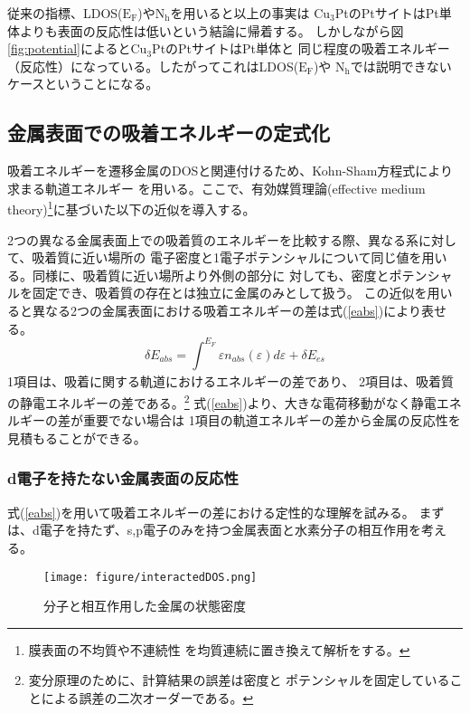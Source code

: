 \documentclass[12pt]{ltjsarticle}
\begin{document}
従来の指標、LDOS($\text{E}_\text{F}$)や$\text{N}_\text{h}$を用いると以上の事実は
$\text{Cu}_\text{3}$PtのPtサイトはPt単体よりも表面の反応性は低いという結論に帰着する。
しかしながら図\ref{fig:potential}によると$\text{Cu}_\text{3}$PtのPtサイトはPt単体と
同じ程度の吸着エネルギー（反応性）になっている。したがってこれはLDOS($\text{E}_\text{F}$)や
$\text{N}_\text{h}$では説明できないケースということになる。

\subsection{金属表面での吸着エネルギーの定式化}
吸着エネルギーを遷移金属のDOSと関連付けるため、Kohn-Sham方程式により求まる軌道エネルギー
を用いる。ここで、有効媒質理論(effective medium theory)\footnote{膜表面の不均質や不連続性
を均質連続に置き換えて解析をする。}に基づいた以下の近似を導入する。

2つの異なる金属表面上での吸着質のエネルギーを比較する際、異なる系に対して、吸着質に近い場所の
電子密度と1電子ポテンシャルについて同じ値を用いる。同様に、吸着質に近い場所より外側の部分に
対しても、密度とポテンシャルを固定でき、吸着質の存在とは独立に金属のみとして扱う。
この近似を用いると異なる2つの金属表面における吸着エネルギーの差は式(\ref{eabs})により表せる。
\begin{equation}
    \label{eabs}
    \delta E_{abs} = \int_{}^{E_F} \varepsilon n_{abs}(\varepsilon) d\varepsilon + 
    \delta E_{es}
\end{equation}
1項目は、吸着に関する軌道におけるエネルギーの差であり、
2項目は、吸着質の静電エネルギーの差である。\footnote{変分原理のために、計算結果の誤差は密度と
ポテンシャルを固定していることによる誤差の二次オーダーである。}
式(\ref{eabs})より、大きな電荷移動がなく静電エネルギーの差が重要でない場合は
1項目の軌道エネルギーの差から金属の反応性を見積もることができる。

\subsubsection{d電子を持たない金属表面の反応性}
式(\ref{eabs})を用いて吸着エネルギーの差における定性的な理解を試みる。
まずは、d電子を持たず、s,p電子のみを持つ金属表面と水素分子の相互作用を考える。
\begin{figure}[hbtp]
    \begin{center}
     \texttt{[image: figure/interactedDOS.png]}
    \end{center}
    \caption{分子と相互作用した金属の状態密度}
    \label{fig:interactedDOS}
\end{figure}
\end{document}
